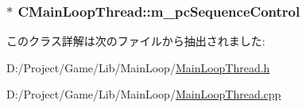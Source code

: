 \subsubsection[{m\+\_\+pc\+Sequence\+Control}]{$\ast$ C\+Main\+Loop\+Thread\+::m\+\_\+pc\+Sequence\+Control\hspace{0.3cm}{\ttfamily [private]}}\label{class_c_main_loop_thread_aad56c0e06d334140719c29eb5da4664c}


このクラス詳解は次のファイルから抽出されました\+:\begin{DoxyCompactItemize}
\item 
D\+:/\+Project/\+Game/\+Lib/\+Main\+Loop/\hyperlink{_main_loop_thread_8h}{Main\+Loop\+Thread.\+h}\item 
D\+:/\+Project/\+Game/\+Lib/\+Main\+Loop/\hyperlink{_main_loop_thread_8cpp}{Main\+Loop\+Thread.\+cpp}\end{DoxyCompactItemize}
